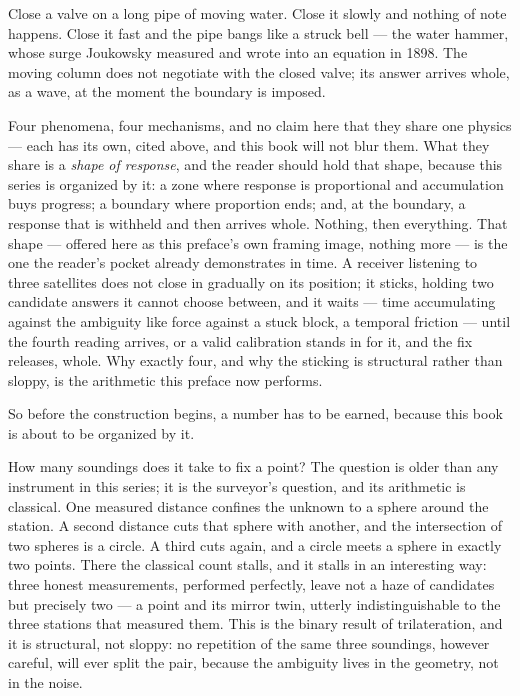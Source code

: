 Close a valve on a long pipe of moving water. Close it slowly and nothing of
note happens. Close it fast and the pipe bangs like a struck bell --- the
water hammer, whose surge Joukowsky measured and wrote into an equation in
1898. The moving column does not negotiate with the closed valve; its answer
arrives whole, as a wave, at the moment the boundary is imposed.

Four phenomena, four mechanisms, and no claim here that they share one
physics --- each has its own, cited above, and this book will not blur them.
What they share is a \emph{shape of response}, and the reader should hold
that shape, because this series is organized by it: a zone where response is
proportional and accumulation buys progress; a boundary where proportion
ends; and, at the boundary, a response that is withheld and then arrives
whole. Nothing, then everything. That shape --- offered here as this
preface's own framing image, nothing more --- is the one the reader's pocket
already demonstrates in time. A receiver listening to three satellites does
not close in gradually on its position; it sticks, holding two candidate
answers it cannot choose between, and it waits --- time accumulating against
the ambiguity like force against a stuck block, a temporal friction ---
until the fourth reading arrives, or a valid calibration stands in for it,
and the fix releases, whole. Why exactly four, and why the sticking is
structural rather than sloppy, is the arithmetic this preface now performs.

So before the construction begins, a number has to be earned, because this
book is about to be organized by it.

How many soundings does it take to fix a point? The question is older than
any instrument in this series; it is the surveyor's question, and its
arithmetic is classical. One measured distance confines the unknown to a
sphere around the station. A second distance cuts that sphere with another,
and the intersection of two spheres is a circle. A third cuts again, and a
circle meets a sphere in exactly two points. There the classical count
stalls, and it stalls in an interesting way: three honest measurements,
performed perfectly, leave not a haze of candidates but precisely two --- a
point and its mirror twin, utterly indistinguishable to the three stations
that measured them. This is the binary result of trilateration, and it is
structural, not sloppy: no repetition of the same three soundings, however
careful, will ever split the pair, because the ambiguity lives in the
geometry, not in the noise.

